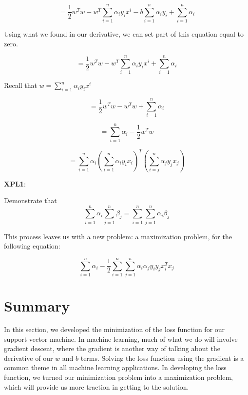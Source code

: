 \[ = \frac{1}{2}w^Tw - w^T \sum_{i=1}^{n} \alpha_i y_i x^i -  b \sum_{i=1}^{n} \alpha_i y_i + \sum_{i=1}^{n} \alpha_i  \]

Using what we found in our derivative, we can set part of this equation equal to zero.

\[ = \frac{1}{2}w^Tw - w^T \sum_{i=1}^{n} \alpha_i y_i x^i + \sum_{i=1}^{n} \alpha_i \]

Recall that \(w = \sum_{i=1}^{n} \alpha_i y_i x^i\)

\[ = \frac{1}{2}w^Tw - w^Tw + \sum_{i=1}^{n} \alpha_i \]

\[ = \sum_{i=1}^{n} \alpha_i  - \frac{1}{2}w^Tw \]

\[ = \sum_{i=1}^{n} \alpha_i ( \sum_{i=1}^{n} \alpha_i y_i x_i )^T ( \sum_{i=j}^{n} \alpha_j y_j x_j ) \]

\begin{tcolorbox}
\textbf{XPL1}:

Demonstrate that 
\[ \sum_{i=1}^n \alpha_i \sum_{j=1}^n \beta_j = \sum_{i=1}^n \sum_{j=1}^n \alpha_i\beta_j  \]

\end{tcolorbox}

This process leaves us with a new problem: a maximization problem, for the following equation: 

\[\sum_{i=1}^n \alpha_i - \frac{1}{2} \sum_{i=1}^n \sum_{j=1}^n \alpha_i \alpha_j y_i y_j x_i^Tx_j\]

\section{Summary}
In this section, we developed the minimization of the loss function for our support vector machine. In machine learning, much of what we do will involve gradient descent, where the gradient is another way of talking about the derivative of our \(w\) and \(b\) terms. Solving the loss function using the gradient is a common theme in all machine learning applications. In developing the loss function, we turned our minimization problem into a maximization problem, which will provide us more traction in getting to the solution. 